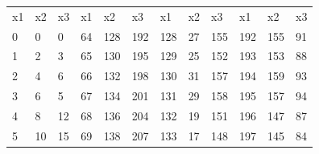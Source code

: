 \begin{table}[]
\begin{tabular}{llllllllllll}
\rowcolor[HTML]{000000} 
{\color[HTML]{FFF} x1} & {\color[HTML]{FFF} x2} & {\color[HTML]{FFF} x3} & {\color[HTML]{FFF} x1} & {\color[HTML]{FFF} x2} & {\color[HTML]{FFF} x3} & {\color[HTML]{FFF} x1} & {\color[HTML]{FFF} x2} & {\color[HTML]{FFF} x3} & {\color[HTML]{FFF} x1} & {\color[HTML]{FFF} x2} & {\color[HTML]{FFF} x3} \\
0                      & 0                      & 0                      & 64                     & 128                    & 192                    & 128                    & 27                     & 155                    & 192                    & 155                    & 91                     \\
1                      & 2                      & 3                      & 65                     & 130                    & 195                    & 129                    & 25                     & 152                    & 193                    & 153                    & 88                     \\
2                      & 4                      & 6                      & 66                     & 132                    & 198                    & 130                    & 31                     & 157                    & 194                    & 159                    & 93                     \\
3                      & 6                      & 5                      & 67                     & 134                    & 201                    & 131                    & 29                     & 158                    & 195                    & 157                    & 94                     \\
4                      & 8                      & 12                     & 68                     & 136                    & 204                    & 132                    & 19                     & 151                    & 196                    & 147                    & 87                     \\
5                      & 10                     & 15                     & 69                     & 138                    & 207                    & 133                    & 17                     & 148                    & 197                    & 145                    & 84                     \\

\end{tabular}
\end{table}
